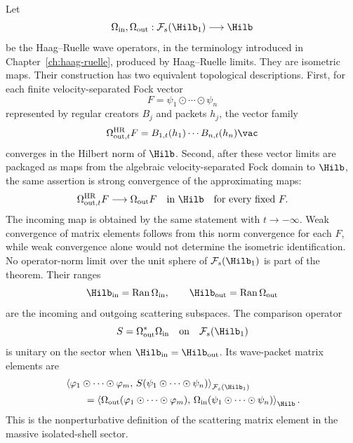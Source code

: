 Let
\[
  \Omega_{\mathrm{in}},\Omega_{\mathrm{out}}:
  \mathcal F_s(\Hilb_1)\longrightarrow\Hilb
\]
be the Haag--Ruelle wave operators, in the terminology introduced in
Chapter~\ref{ch:haag-ruelle}, produced by Haag--Ruelle limits.  They are
isometric maps.  Their construction has two equivalent topological
descriptions.  First, for each finite velocity-separated Fock vector
\[
  F=\psi_1\odot\cdots\odot\psi_n
\]
represented by regular creators \(B_j\) and packets \(h_j\), the vector family
\[
  \Omega_{{\rm out},t}^{\rm HR}F
  =
  B_{1,t}(h_1)\cdots B_{n,t}(h_n)\vac
\]
converges in the Hilbert norm of \(\Hilb\).  Second, after these vector limits
are packaged as maps from the algebraic velocity-separated Fock domain to
\(\Hilb\), the same assertion is strong convergence of the approximating maps:
\begin{equation}
  \Omega_{{\rm out},t}^{\rm HR}F
  \longrightarrow
  \Omega_{\rm out}F
  \quad\text{in }\Hilb
  \quad\text{for every fixed }F.
  \label{eq:algebraic-haag-ruelle-strong-operator-limit}
\end{equation}
The incoming map is obtained by the same statement with \(t\to-\infty\).
Weak convergence of matrix elements follows from this norm convergence for
each \(F\), while weak convergence alone would not determine the isometric
identification.  No operator-norm limit over the unit sphere of
\(\mathcal F_s(\Hilb_1)\) is part of the theorem.  Their ranges
\[
  \Hilb_{\mathrm{in}}=\operatorname{Ran}\Omega_{\mathrm{in}},
  \qquad
  \Hilb_{\mathrm{out}}=\operatorname{Ran}\Omega_{\mathrm{out}}
\]
are the incoming and outgoing scattering subspaces.  The comparison operator
\[
  S=\Omega_{\mathrm{out}}^*\Omega_{\mathrm{in}}
  \quad\text{on}\quad \mathcal F_s(\Hilb_1)
\]
is unitary on the sector when \(\Hilb_{\mathrm{in}}=\Hilb_{\mathrm{out}}\).  Its
wave-packet matrix elements are
\[
\begin{aligned}
&\left\langle
  \varphi_1\odot\cdots\odot\varphi_m,\,
  S(\psi_1\odot\cdots\odot\psi_n)
  \right\rangle_{\mathcal F_s(\Hilb_1)}
\\
&\qquad =
  \left\langle
  \Omega_{\mathrm{out}}(\varphi_1\odot\cdots\odot\varphi_m),\,
  \Omega_{\mathrm{in}}(\psi_1\odot\cdots\odot\psi_n)
  \right\rangle_{\Hilb}.
\end{aligned}
\]
This is the nonperturbative definition of the scattering matrix element in
the massive isolated-shell sector.

